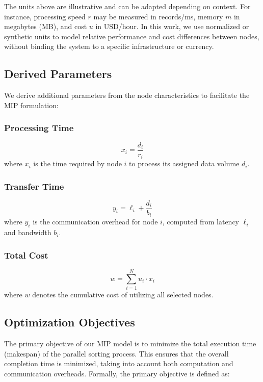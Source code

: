 \documentclass[]{interact}
\theoremstyle{plain}
\theoremstyle{definition}
\theoremstyle{remark}
\begin{document}
The units above are illustrative and can be adapted depending on context. For instance, processing speed $r$ may be measured in records/ms, memory $m$ in megabytes (MB), and cost $u$ in USD/hour. In this work, we use normalized or synthetic units to model relative performance and cost differences between nodes, without binding the system to a specific infrastructure or currency.


\subsection{Derived Parameters}

We derive additional parameters from the node characteristics to facilitate the MIP formulation:

\subsubsection{Processing Time}
\begin{equation}
    x_i = \frac{d_i}{r_i}
\end{equation}
where $x_i$ is the time required by node $i$ to process its assigned data volume $d_i$.

\subsubsection{Transfer Time}
\begin{equation}
    y_i = \ell_i + \frac{d_i}{b_i}
\end{equation}
where $y_i$ is the communication overhead for node $i$, computed from latency $\ell_i$ and bandwidth $b_i$.

\subsubsection{Total Cost}
\begin{equation}
    w = \sum_{i=1}^N u_i \cdot x_i
\end{equation}
where $w$ denotes the cumulative cost of utilizing all selected nodes.

\subsection{Optimization Objectives}

The primary objective of our MIP model is to minimize the total execution time (makespan) of the parallel sorting process. This ensures that the overall completion time is minimized, taking into account both computation and communication overheads. Formally, the primary objective is defined as:
\end{document}
